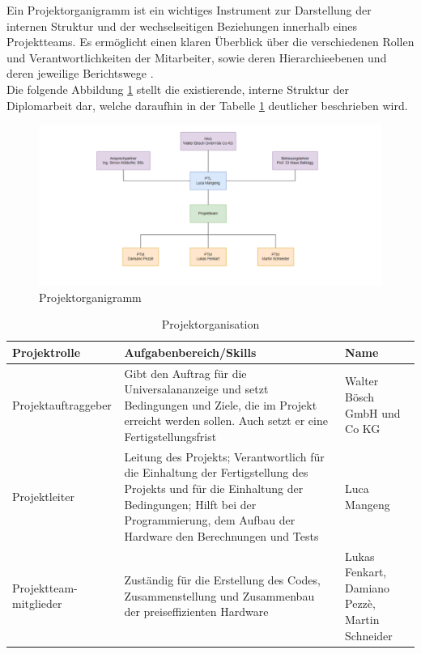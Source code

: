 Ein Projektorganigramm ist ein wichtiges Instrument zur Darstellung der internen Struktur und der wechselseitigen Beziehungen innerhalb eines Projektteams. Es ermöglicht einen klaren Überblick über die verschiedenen Rollen und Verantwortlichkeiten der Mitarbeiter, sowie deren Hierarchieebenen und deren jeweilige Berichtswege \cite[vgl.][]{projektmanagement-definitionen:2009}. \\
Die folgende Abbildung \ref{fig:organigramm} stellt die existierende, interne Struktur der Diplomarbeit dar, welche daraufhin in der Tabelle \ref{tab:projektorganisation} deutlicher beschrieben wird.

\begin{figure}[H]
	\centering
	\includegraphics[width=0.9\linewidth]{Bilder/Organigramm}
	\caption{Projektorganigramm}
	\label{fig:organigramm}
\end{figure}

\begin{table}[H]
	\caption{Projektorganisation}
	\label{tab:projektorganisation}
	\begin{tabular}{p{} | p{} | p{}}
		\toprule
		\textbf{Projektrolle} & \textbf{Aufgabenbereich/Skills} & \textbf{Name} \\
		\midrule
		Projektauftraggeber & Gibt den Auftrag für die Universalananzeige und setzt Bedingungen und Ziele, die im Projekt erreicht werden sollen. Auch setzt er eine Fertigstellungsfrist & Walter Bösch GmbH und Co KG
		\\
		\midrule
		Projektleiter & Leitung des Projekts;
		Verantwortlich für die Einhaltung der Fertigstellung des Projekts und für die Einhaltung der Bedingungen; Hilft bei der Programmierung, dem Aufbau der Hardware den Berechnungen und Tests
		 & Luca Mangeng
		\\
		\midrule
		Projektteam-mitglieder & Zuständig für die Erstellung des Codes, Zusammenstellung und Zusammenbau der preiseffizienten Hardware & 
		Lukas Fenkart, Damiano Pezzè, Martin Schneider
		\\
		\bottomrule
	\end{tabular}
\end{table}